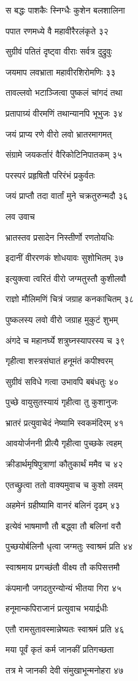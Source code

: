 स बद्धः पाशकैः स्निग्धैः कुशेन बलशालिना

पपात रणमध्ये वै महावीरैरलंकृते ३२

सुग्रीवं पतितं दृष्ट्वा वीराः सर्वत्र दुद्रुवुः

जयमाप लवभ्राता महावीरशिरोमणिः ३३

तावल्लवो भटाञ्जित्वा पुष्कलं चांगदं तथा

प्रतापाग्र्यं वीरमणिं तथान्यानपि भूभुजः ३४

जयं प्राप्य रणे वीरो लवो भ्रातरमागमत्

संग्रामे जयकर्तारं वैरिकोटिनिपातकम् ३५

परस्परं प्रहृषितौ परिरंभं प्रकुर्वतः

जयं प्राप्तौ तदा वार्तां मुने चक्रतुरुन्मदौ ३६

लव उवाच

भ्रातस्तव प्रसादेन निस्तीर्णो रणतोयधिः

इदानीं वीररणकं शोधयावः सुशोभितम् ३७

इत्युक्त्वा त्वरितं वीरो जग्मतुस्तौ कुशीलवौ

राज्ञो मौलिमणिं चित्रं जग्राह कनकाचितम् ३८

पुष्कलस्य लवो वीरो जग्राह मुकुटं शुभम्

अंगदे च महानर्घ्ये शत्रुघ्नस्यापरस्य च ३९

गृहीत्वा शस्त्रसंघातं हनूमंतं कपीश्वरम्

सुग्रीवं सविधे गत्वा उभावपि बबंधतुः ४०

पुच्छे वायुसुतस्यायं गृहीत्वा तु कुशानुजः

भ्रातरं प्रत्युवाचेदं नेष्यामि स्वकमंदिरम् ४१

आवयोर्जननी प्रीत्यै गृहीत्वा पुच्छके त्वहम्

क्रीडार्थमृषिपुत्राणां कौतुकार्थं ममैव च ४२

एतच्छ्रुत्वा ततो वाक्यमुवाच च कुशो लवम्

अहमेनं ग्रहीष्यामि वानरं बलिनं दृढम् ४३

इत्येवं भाषमाणौ तौ बद्ध्वा तौ बलिनां वरौ

पुच्छयोर्बलिनौ धृत्वा जग्मतुः स्वाश्रमं प्रति ४४

स्वाश्रमाय प्रगच्छंतौ वीक्ष्य तौ कपिसत्तमौ

कंपमानौ जगदतुरन्योन्यं भीतया गिरा ४५

हनूमान्कपिराजानं प्रत्युवाच भयार्द्रधीः

एतौ रामसुतावस्मान्नेष्यतः स्वाश्रमं प्रति ४६

मया पूर्वं कृतं कर्म जानकीं प्रतिगच्छता

तत्र मे जानकी देवी संमुखाभून्मनोहरा ४७

